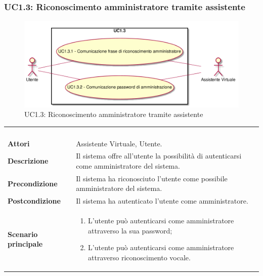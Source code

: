 \newpage\subsubsection{UC1.3: Riconoscimento amministratore tramite assistente}
\label{UC1.3}
\begin{figure}[h]
	\centering
	\includegraphics[width=\textwidth,height=\textheight,keepaspectratio]{images/UseCaseUC13.png}
	\caption{UC1.3: Riconoscimento amministratore tramite assistente}
\end{figure}
\begin{longtable}{l|p{10cm}}
	\rowcolor[gray]{0.8} \multicolumn{2}{c}{} \\
	\rowcolor[gray]{0.8} \multicolumn{2}{c}{\textbf{UC1.3 - Riconoscimento amministratore tramite assistente}} \\
	\rowcolor[gray]{0.8} \multicolumn{2}{c}{} \\
	\hline
	&\\
	\textbf{Attori} & Assistente Virtuale, Utente.\\[7pt]
	\textbf{Descrizione} & Il sistema offre all'utente la possibilità di autenticarsi come amministratore del sistema.\\[7pt]
	\textbf{Precondizione} & Il sistema ha riconosciuto l'utente come possibile amministratore del sistema.\\[7pt]
	\textbf{Postcondizione} & Il sistema ha autenticato l'utente come amministratore. \\[7pt]
	\textbf{Scenario principale} &\begin{enumerate}
		\item  L'utente può autenticarsi come amministratore attraverso la sua password;
		\item  L'utente può autenticarsi come amministratore attraverso riconoscimento vocale.
	\end{enumerate}
	\\[7pt]\hline
\end{longtable}

